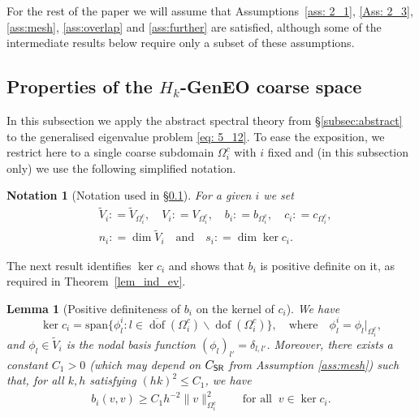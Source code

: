 \documentclass[numbers,webpdf,imaiai]{ima-authoring-template}%
\theoremstyle{thmstyletwo}%
\newtheorem{notation}[theorem]{Notation}
\newtheorem{lemma}[theorem]{Lemma}
\numberwithin{equation}{section}
\newcommand{\shapereg}{C_{\textup{\textsf{SR}}}}
\newcommand{\assign}{\mathrel{\mathop:}=}
\newcommand{\tV}{\widetilde{V}}
\numberwithin{equation}{section}
\DeclareMathOperator{\dof}{dof}
\newcommand{\ovdof}{\overline{\dof}}
\begin{document}
{For the rest of the paper we will assume that Assumptions~\ref{ass: 2_1}, \ref{Ass: 2_3}, \ref{ass:mesh}, \ref{ass:overlap} and \ref{ass:further}
are  satisfied, although some of the intermediate results below require only a subset of these assumptions.


\subsection[Properties of the $H_k$-GenEO coarse space]{Properties of the {\boldmath$H_k$}-GenEO coarse space}
\label{subsec:coarse_space}

In this subsection we  apply the abstract spectral theory from  \S\ref{subsec:abstract}
to the generalised eigenvalue problem \eqref{eq:  5_12}.  To ease the exposition, we restrict here to a  
single coarse subdomain $\Omega_i^c$ with $i$ fixed and (in this subsection only) we use the following simplified notation.

\begin{notation}[Notation used in  \S \ref{subsec:coarse_space}]
\label{not:simple}
For a given $i$ we set
\begin{align*} 
	& \widetilde{V}_i \assign \widetilde{V}_{\Omega_i^c}, \quad 
	V_i \assign V_{\Omega_i^c}, \quad 
	b_i \assign {b}_{\Omega_i^c}, \quad 
	c_i \assign c_{\Omega_i^c},
	\\ 
	& n_i \assign \dim \widetilde{V}_i \quad \text{and} \quad 
	s_i \assign \dim \ker c_i. 
\end{align*}
\end{notation}

\noindent 
The next result identifies  $\ker c_i$ and shows that $b_i$ is positive definite on it, 
as required in Theorem~\ref{lem_ind_ev}.

\begin{lemma}[Positive definiteness of $b_i$ on the kernel of $c_i$] 
\label{PBP_PD}
We have 
\begin{equation}\label{ker_scC}
	\ker c_i = \mathrm{span} \{ \phi_l^i: l \in \ovdof(\Omega_i^c) \backslash \dof(\Omega_i^c)\}, 
	\quad \text{where} \quad \phi_l^i = \phi_l\vert_{\Omega_i^c},   
\end{equation}
and $\phi_l\in \tV_i$ is the nodal basis function $(\phi_l)_{l'} = \delta_{l,l'}$. 
Moreover, there exists a constant $C_1>0$ (which may depend on $\shapereg$ from Assumption \ref{ass:mesh}) such that,  
for all $k,h$ satisfying $(hk)^2 \le C_1$, we have 
\begin{align} \label{pdb1}
	b_i(v,v) \ge {C_1} h^{-2} \|v\|_{\Omega_i^c}^2   \qquad \text{for all} \;\; v \in \ker c_i.
\end{align}
\end{lemma}

}
\end{document}
